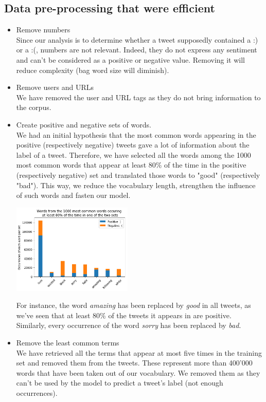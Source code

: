 \documentclass[letterpaper, 10 pt, conference]{ieeeconf}  %
\begin{document}
\subsection{Data pre-processing that were efficient}
\begin{itemize}
    \item Remove numbers \ \\
    Since our analysis is to determine whether a tweet supposedly contained a :) or a :(, numbers are not relevant. Indeed, they do not express any sentiment and can't be considered as a positive or negative value. Removing it will reduce complexity (bag word size will diminish).\vspace*{0,25\baselineskip}
    \item Remove users and URLs \ \\ 
    We have removed the user and URL tags as they do not bring information to the corpus.\vspace*{0,25\baselineskip}
    \item Create positive and negative sets of words. \ \\
    We had an initial hypothesis that the most common words appearing in the positive (respectively negative) tweets gave a lot of information about the label of a tweet. Therefore, we have selected all the words among the 1000 most common words that appear at least 80\% of the time in the positive (respectively negative) set and translated those words to "good" (respectively "bad"). This way, we reduce the vocabulary length, strengthen the influence of such words and fasten our model.
    \vspace*{0,5\baselineskip}

   
    \includegraphics[width=0.45\textwidth]{histogram_ML.png}
    

    For instance, the word \textit{amazing} has been replaced by \textit{good} in all tweets, as we've seen that at least 80\% of the tweets it appears in are positive. Similarly, every occurrence of the word \textit{sorry} has been replaced by \textit{bad}.\vspace*{0,25\baselineskip}
    
    \item Remove the least common terms \ \\
    We have retrieved all the terms that appear at most five times in the training set and removed them from the tweets. These represent more than 400'000 words that have been taken out of our vocabulary. We removed them as they can't be used by the model to predict a tweet's label (not enough occurrences).
\end{itemize}
\end{document}

